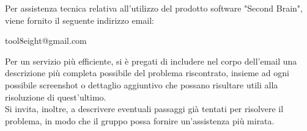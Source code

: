 \documentclass[a4paper,10pt]{article}
\begin{document}
Per assistenza tecnica relativa all'utilizzo del prodotto software "Second Brain", viene fornito il seguente indirizzo email: 
\begin{center}
    tool8eight@gmail.com
\end{center}
Per un servizio più efficiente, si è pregati di includere nel corpo dell'email una descrizione più completa possibile del problema riscontrato, insieme ad ogni possibile screenshot o dettaglio aggiuntivo che possano risultare utili alla risoluzione di quest'ultimo. \\
Si invita, inoltre, a descrivere eventuali passaggi già tentati per risolvere il problema, in modo che il gruppo possa fornire un'assistenza più mirata.
\end{document}
